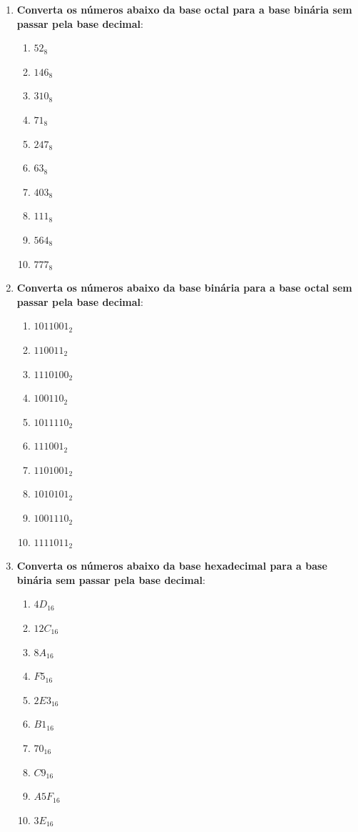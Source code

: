 \begin{enumerate}
    \item \textbf{Converta os números abaixo da base octal para a base binária sem passar pela base decimal}:
          \begin{enumerate}
              \item $52_{8}$
              \item $146_{8}$
              \item $310_{8}$
              \item $71_{8}$
              \item $247_{8}$
              \item $63_{8}$
              \item $403_{8}$
              \item $111_{8}$
              \item $564_{8}$
              \item $777_{8}$
          \end{enumerate}

    \item \textbf{Converta os números abaixo da base binária para a base octal sem passar pela base decimal}:
          \begin{enumerate}
              \item $1011001_{2}$
              \item $110011_{2}$
              \item $1110100_{2}$
              \item $100110_{2}$
              \item $1011110_{2}$
              \item $111001_{2}$
              \item $1101001_{2}$
              \item $1010101_{2}$
              \item $1001110_{2}$
              \item $1111011_{2}$
          \end{enumerate}

    \item \textbf{Converta os números abaixo da base hexadecimal para a base binária sem passar pela base decimal}:
          \begin{enumerate}
              \item $4D_{16}$
              \item $12C_{16}$
              \item $8A_{16}$
              \item $F5_{16}$
              \item $2E3_{16}$
              \item $B1_{16}$
              \item $70_{16}$
              \item $C9_{16}$
              \item $A5F_{16}$
              \item $3E_{16}$
          \end{enumerate}


\end{enumerate}
